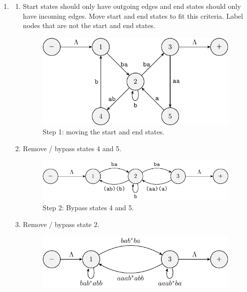 \begin{solution}
    \begin{enumerate}[label={\bf \alph*)}]
        \item \begin{enumerate}[label=\arabic*:]
            \item Start states should only have outgoing edges and end states should only have incoming edges.
            Move start and end states to fit this criteria.
            Label nodes that are not the start and end states.
            \newpage
            \begin{figure}[h!]
                \centering
                \includegraphics[]{figures/answer/Answer1A1.pdf}
                \caption*{Step 1: moving the start and end states.}
            \end{figure}
            \item Remove / bypass states 4 and 5.
            \begin{figure}[H]
                \centering
                \includegraphics[]{figures/answer/Answer1A2.pdf}
                \caption*{Step 2: Bypass states 4 and 5.}
            \end{figure}
            \item Remove / bypass state 2.
            \begin{figure}[H]
                \centering
                \includegraphics[]{figures/answer/Answer1A3.pdf}

\end{figure}
\end{enumerate}
\end{enumerate}
\end{solution}
